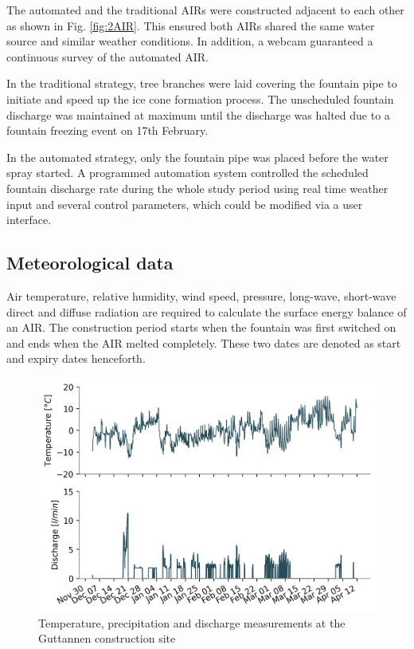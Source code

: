 \documentclass[tc, manuscript]{copernicus}
\begin{document}
The automated and the traditional AIRs were constructed adjacent to each other as shown in Fig. \ref{fig:2AIR}.
This ensured both AIRs shared the same water source and similar weather conditions. In addition, a webcam
guaranteed a continuous survey of the automated AIR.   

In the traditional strategy, tree branches were laid covering the fountain pipe to initiate and speed up the ice
cone formation process. The unscheduled fountain discharge was maintained at maximum until the discharge was
halted due to a fountain freezing event on 17th February.

In the automated strategy, only the fountain pipe was placed before the water spray started. A programmed
automation system controlled the scheduled fountain discharge rate during the whole study period using real time
weather input and several control parameters, which could be modified via a user interface. 

\subsection{Meteorological data}

Air temperature, relative humidity, wind speed, pressure, long-wave, short-wave direct and diffuse radiation are
required to calculate the surface energy balance of an AIR. The construction period starts when the fountain was
first switched on and ends when the AIR melted completely. These two dates are denoted as start and expiry dates
henceforth.

\begin{figure}[t]
\includegraphics[width=12cm]{Figures/disvstemp.png}
\caption{Temperature, precipitation and discharge measurements at the Guttannen construction site}
\label{fig:aws} 
\end{figure}
\end{document}
